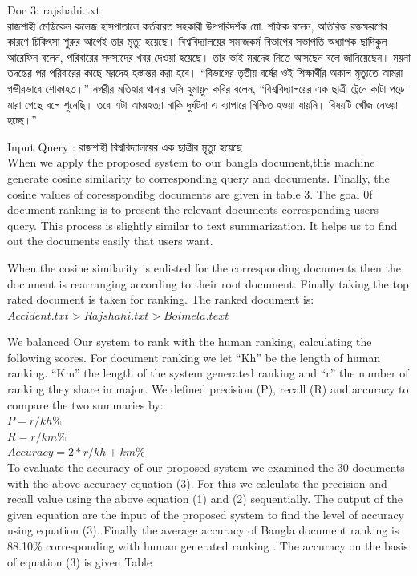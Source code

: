 Doc 3: rajshahi.txt\\
রাজশাহী মেডিকেল কলেজ হাসপাতালে কর্তব্যরত সহকারী উপপরিদর্শক মো. শফিক বলেন, অতিরিক্ত রক্তক্ষরণের কারণে চিকিৎসা শুরুর আগেই তার মৃত্যু হয়েছে।  বিশ্ববিদ্যালয়ের সমাজকর্ম বিভাগের সভাপতি অধ্যাপক ছাদিকুল আরেফিন বলেন, পরিবারের সদস্যদের খবর দেওয়া হয়েছে। তার ভাই মরদেহ নিতে আসছেন বলে জানিয়েছেন। ময়না তদন্তের পর পরিবারের কাছে মরদেহ হস্তান্তর করা হবে। “বিভাগের তৃতীয় বর্ষের ওই শিক্ষার্থীর অকাল মৃত্যুতে আমরা গভীরভাবে শোকাহত।” নগরীর মতিহার থানার ওসি হুমায়ুন কবির বলেন, “বিশ্ববিদ্যালয়ের এক ছাত্রী ট্রেনে কাটা পড়ে মারা গেছে বলে শুনেছি। তবে এটা আত্মহত্যা নাকি দুর্ঘটনা এ ব্যাপারে নিশ্চিত হওয়া যায়নি। বিষয়টি খোঁজ নেওয়া হচ্ছে।”


Input Query : রাজশাহী বিশ্ববিদ্যালয়ের এক ছাত্রীর মৃত্যু হয়েছে\\

When we apply the proposed system to our bangla document,this machine generate cosine similarity to corresponding query and documents. Finally, the cosine values of coresspondibg documents are given in table 3. The goal 0f document ranking is to present the relevant documents corresponding users query. This process is slightly similar to text summarization. It helps us to find out the documents easily that users want.

When the cosine similarity is enlisted for the corresponding documents then the document is rearranging according to their root document. Finally taking the top rated document is taken for ranking. The ranked document is:\\
		$Accident.txt > Rajshahi.txt > Boimela.text$
		
We balanced Our system to rank with the human ranking, calculating the following scores. For document ranking we let  “Kh”  be the length of human ranking. “Km” the length of the system generated ranking and  “r” the number of ranking they share in major. We defined precision (P), recall (R) and accuracy to compare the two summaries by:\\
\(P =  r/kh \%\)\\
\(R =  r/km \%\)\\
\(Accuracy =  2*r / kh + km \%\)\\


To evaluate the accuracy of our proposed system we examined the 30 documents with the above accuracy equation (3). For this we calculate the precision and recall value using  the above equation  (1) and  (2) sequentially. The output of the given equation are the  input of the proposed system to find the level of accuracy using equation (3). Finally the average accuracy of Bangla document ranking is 88.10\% corresponding with human generated ranking . The accuracy on the basis of equation (3) is given Table      



